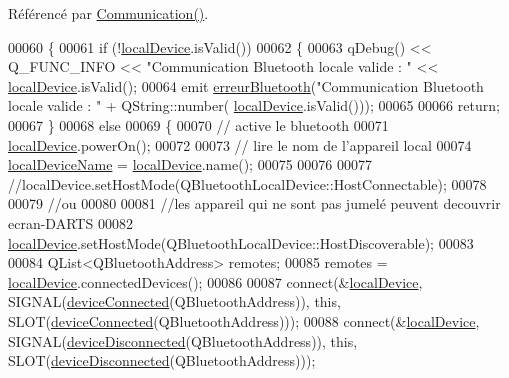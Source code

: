 Référencé par \hyperlink{communication_8cpp_source_l00022}{Communication()}.


\begin{DoxyCode}
00060 \{
00061     \textcolor{keywordflow}{if} (!\hyperlink{class_communication_a6281796eab7523bef6be1a766e0e906f}{localDevice}.isValid())
00062     \{
00063         qDebug() << Q\_FUNC\_INFO << \textcolor{stringliteral}{"Communication Bluetooth locale valide : "} << 
      \hyperlink{class_communication_a6281796eab7523bef6be1a766e0e906f}{localDevice}.isValid();
00064         emit \hyperlink{class_communication_a9cb85e46b57b6dfa9e71408010bfc0a9}{erreurBluetooth}(\textcolor{stringliteral}{"Communication Bluetooth locale valide : "} + QString::number(
      \hyperlink{class_communication_a6281796eab7523bef6be1a766e0e906f}{localDevice}.isValid()));
00065 
00066         \textcolor{keywordflow}{return};
00067     \}
00068     \textcolor{keywordflow}{else}
00069     \{
00070         \textcolor{comment}{// active le bluetooth}
00071         \hyperlink{class_communication_a6281796eab7523bef6be1a766e0e906f}{localDevice}.powerOn();
00072 
00073         \textcolor{comment}{// lire le nom de l'appareil local}
00074         \hyperlink{class_communication_aa70c6b4acb921b03ffa8b8b044e87a94}{localDeviceName} = \hyperlink{class_communication_a6281796eab7523bef6be1a766e0e906f}{localDevice}.name();
00075 
00076 
00077         \textcolor{comment}{//localDevice.setHostMode(QBluetoothLocalDevice::HostConnectable);}
00078 
00079         \textcolor{comment}{//ou}
00080 
00081         \textcolor{comment}{//les appareil qui ne sont pas jumelé peuvent decouvrir ecran-DARTS}
00082         \hyperlink{class_communication_a6281796eab7523bef6be1a766e0e906f}{localDevice}.setHostMode(QBluetoothLocalDevice::HostDiscoverable);
00083 
00084         QList<QBluetoothAddress> remotes;
00085         remotes = \hyperlink{class_communication_a6281796eab7523bef6be1a766e0e906f}{localDevice}.connectedDevices();
00086 
00087         connect(&\hyperlink{class_communication_a6281796eab7523bef6be1a766e0e906f}{localDevice}, SIGNAL(\hyperlink{class_communication_a33db5c9db5da71c20c8c544d1de4eb9a}{deviceConnected}(QBluetoothAddress)), \textcolor{keyword}{this}, 
      SLOT(\hyperlink{class_communication_a33db5c9db5da71c20c8c544d1de4eb9a}{deviceConnected}(QBluetoothAddress)));
00088         connect(&\hyperlink{class_communication_a6281796eab7523bef6be1a766e0e906f}{localDevice}, SIGNAL(\hyperlink{class_communication_a0ee021f517bb0e3f7149ed13f8faf0b1}{deviceDisconnected}(QBluetoothAddress)), \textcolor{keyword}{
      this}, SLOT(\hyperlink{class_communication_a0ee021f517bb0e3f7149ed13f8faf0b1}{deviceDisconnected}(QBluetoothAddress)));

\end{DoxyCode}
